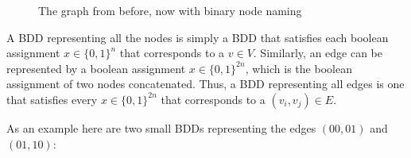 \documentclass[../master/master.tex]{subfiles}
\begin{document}
\begin{figure}[H]
\center
{}
\caption{The graph from before, now with binary node naming}
\label{graphforbdd}
\end{figure}


A BDD representing all the nodes is simply a BDD that satisfies each boolean assignment $x\in\{0,1\}^n$ that corresponds to a $v\in V$. Similarly, an edge can be represented by a boolean assignment $x\in\{0,1\}^{2n}$, which is the boolean assignment of two nodes concatenated. Thus, a BDD representing all edges is one that satisfies every $x\in\{0,1\}^{2n}$ that corresponds to a $(v_i, v_j)\in E$.

As an example here are two small BDDs representing the edges $(00,01)$ and $(01,10)$:
\end{document}
